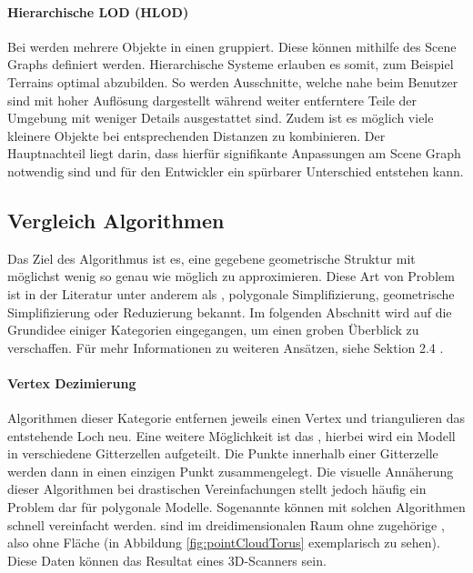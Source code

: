 \paragraph{Hierarchische LOD (HLOD)}
Bei  werden mehrere Objekte in einen  gruppiert. Diese  können mithilfe des \glspl{Scene Graph} definiert werden.
Hierarchische Systeme erlauben es somit, zum Beispiel Terrains optimal abzubilden. So werden Ausschnitte, welche nahe beim Benutzer sind mit hoher Auflösung dargestellt während weiter entferntere Teile der Umgebung mit weniger Details ausgestattet sind.
Zudem ist es möglich viele kleinere Objekte bei entsprechenden Distanzen zu kombinieren.
Der Hauptnachteil liegt darin, dass hierfür signifikante Anpassungen am \gls{Scene Graph} notwendig sind und für den Entwickler ein spürbarer Unterschied entstehen kann.

\subsection{Vergleich Algorithmen}
\label{chap:lodAlgorithmComparison}

Das Ziel des Algorithmus ist es, eine gegebene geometrische Struktur mit möglichst wenig  so genau wie möglich zu approximieren.
Diese Art von Problem ist in der Literatur unter anderem als , polygonale Simplifizierung, geometrische Simplifizierung oder  Reduzierung bekannt.
Im folgenden Abschnitt wird auf die Grundidee einiger Kategorien eingegangen, um einen groben Überblick zu verschaffen.
Für mehr Informationen zu weiteren Ansätzen, siehe  Sektion 2.4 \cite{quadridBasedSurfaceSimplification}.

\paragraph{Vertex Dezimierung}
Algorithmen dieser Kategorie entfernen jeweils einen Vertex und triangulieren das entstehende Loch neu.
Eine weitere Möglichkeit ist das , hierbei wird ein Modell in verschiedene Gitterzellen aufgeteilt. Die Punkte innerhalb einer Gitterzelle werden dann in einen einzigen Punkt zusammengelegt. Die visuelle Annäherung dieser Algorithmen bei drastischen Vereinfachungen stellt jedoch häufig ein Problem dar für polygonale Modelle. Sogenannte  können mit solchen Algorithmen schnell vereinfacht werden.
 sind  im dreidimensionalen Raum ohne zugehörige , also ohne Fläche (in Abbildung \ref{fig:pointCloudTorus} exemplarisch zu sehen). Diese Daten können das Resultat eines 3D-Scanners sein.

